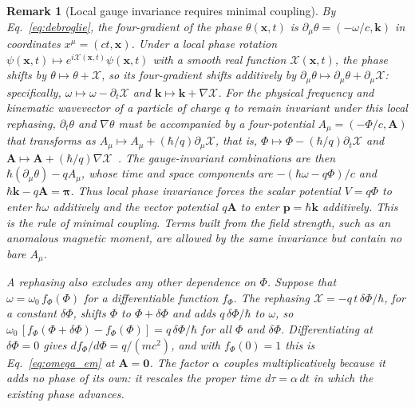 \documentclass[aps,prd,onecolumn,tightenlines,nofootinbib,notitlepage,11pt,floatfix]{revtex4-2}
\theoremstyle{indentedtheorem}
\newtheorem{remark}{Remark}
\begin{document}
\begin{remark}[Local gauge invariance requires minimal coupling]
\label{rem:additivity}
By Eq.~\eqref{eq:debroglie}, the four-gradient of the phase $\theta(\mathbf{x},t)$ is $\partial_\mu\theta = (-\omega/c,\mathbf{k})$ in coordinates $x^\mu=(ct,\mathbf{x})$. Under a local phase rotation $\psi(\mathbf{x},t) \mapsto e^{i\mathcal{X}(\mathbf{x},t)}\psi(\mathbf{x},t)$ with a smooth real function $\mathcal{X}(\mathbf{x},t)$, the phase shifts by $\theta \mapsto \theta + \mathcal{X}$, so its four-gradient shifts additively by $\partial_\mu\theta \mapsto \partial_\mu\theta + \partial_\mu\mathcal{X}$: specifically, $\omega \mapsto \omega - \partial_t\mathcal{X}$ and $\mathbf{k} \mapsto \mathbf{k} + \nabla\mathcal{X}$. For the physical frequency and kinematic wavevector of a particle of charge $q$ to remain invariant under this local rephasing, $\partial_t\theta$ and $\nabla\theta$ must be accompanied by a four-potential $A_\mu = (-\Phi/c,\mathbf{A})$ that transforms as $A_\mu \mapsto A_\mu + (\hbar/q)\partial_\mu\mathcal{X}$, that is, $\Phi \mapsto \Phi - (\hbar/q)\partial_t\mathcal{X}$ and $\mathbf{A} \mapsto \mathbf{A} + (\hbar/q)\nabla\mathcal{X}$~\citep{Weyl1929Elektron,Yang1954Conservation}. The gauge-invariant combinations are then $\hbar(\partial_\mu\theta) - qA_\mu$, whose time and space components are $-(\hbar\omega - q\Phi)/c$ and $\hbar\mathbf{k} - q\mathbf{A} = \boldsymbol{\pi}$. Thus local phase invariance forces the scalar potential $V=q\Phi$ to enter $\hbar\omega$ additively and the vector potential $q\mathbf{A}$ to enter $\mathbf{p}=\hbar\mathbf{k}$ additively. This is the rule of \emph{minimal coupling}. Terms built from the field strength, such as an anomalous magnetic moment, are allowed by the same invariance but contain no bare $A_\mu$.

A rephasing also excludes any other dependence on $\Phi$. Suppose that $\omega=\omega_0\,f_\Phi(\Phi)$ for a differentiable function $f_\Phi$. The rephasing $\mathcal{X}=-q\,t\,\delta\Phi/\hbar$, for a constant $\delta\Phi$, shifts $\Phi$ to $\Phi+\delta\Phi$ and adds $q\,\delta\Phi/\hbar$ to $\omega$, so $\omega_0\,[f_\Phi(\Phi+\delta\Phi)-f_\Phi(\Phi)]=q\,\delta\Phi/\hbar$ for all $\Phi$ and $\delta\Phi$. Differentiating at $\delta\Phi=0$ gives $df_\Phi/d\Phi=q/(mc^2)$, and with $f_\Phi(0)=1$ this is Eq.~\eqref{eq:omega_em} at $\mathbf{A}=\mathbf{0}$. The factor $\alpha$ couples multiplicatively because it adds no phase of its own: it rescales the proper time $d\tau=\alpha\,dt$ in which the existing phase advances.
\end{remark}
\end{document}
